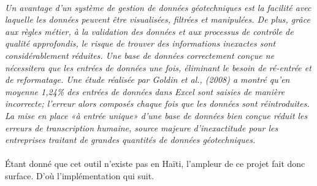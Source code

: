 \paragraph{}
\textit{Un avantage d'un système de gestion de données géotechniques est 
la facilité avec laquelle les données 
peuvent être visualisées, filtrées et manipulées.
De plus, grâce aux règles métier, à la validation des données et aux 
processus de contrôle de qualité approfondis, le risque de trouver
des informations inexactes sont considérablement réduites. Une base de 
données correctement conçue ne nécessitera que les entrées de données
une fois, éliminant le besoin de ré-entrée et de reformatage. Une 
étude réalisée par Goldin et al.,
(2008) a montré qu'en moyenne 1,24\% des entrées de données dans Excel 
sont saisies de manière incorrecte; l'erreur alors
composés chaque fois que les données sont réintroduites. La mise en place 
«à entrée unique» d’une base de données bien conçue réduit les erreurs de 
transcription humaine, source majeure d’inexactitude pour les entreprises
traitant de grandes quantités de données géotechniques.}
\cite{keen2015development}
\paragraph{}
Étant donné que cet outil n'existe pas 
en Haïti, l'ampleur de ce projet fait donc surface.
D'où l'implémentation qui suit.